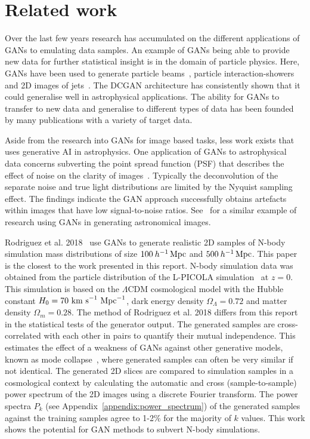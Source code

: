 \documentclass[twocolumn]{article}
\numberwithin{equation}{section}
\begin{document}
\section{Related work}\label{sec:related_work}
Over the last few years research has accumulated on the different applications of GANs to emulating data samples. An 
example of GANs being able to provide new data for further statistical insight is in the domain of particle physics. Here, 
GANs have been used to generate particle beams~\cite{muon_beams_gan}, particle interaction-showers~\cite{particle_showers_gan} 
and 2D images of jets~\cite{particle_jets_gan}. The DCGAN architecture has consistently shown that it could generalise well 
in astrophysical applications. The ability for GANs to transfer to new data and generalise to different types of data has 
been founded by many publications with a variety of target data.

Aside from the research into GANs for image based tasks, less work exists that uses generative AI in astrophysics. One 
application of GANs to astrophysical data concerns subverting the point spread function (PSF) that describes the effect 
of noise on the clarity of images~\cite{gal_im_gen3}. Typically the deconvolution of the separate noise and true light 
distributions are limited by the Nyquist sampling effect. The findings indicate the GAN approach successfully obtains 
artefacts within images that have low signal-to-noise ratios. See~\cite{gal_im_gen2} for a similar example of research 
using GANs in generating astronomical images.

Rodriguez et al. 2018~\cite{web_gan} use GANs to generate realistic 2D samples of N-body simulation mass distributions 
of size $100 \: h^{-1} \,\textup{Mpc}$ and $500 \: h^{-1} \,\textup{Mpc}$. This paper is the closest to the work 
presented in this report. N-body simulation data was obtained from the particle distribution of the L-PICOLA 
simulation~\cite{LPICOLA} at $z=0$. This simulation is based on the $\Lambda \text{CDM}$ cosmological model with 
the Hubble constant $H_0=70\textup{ km s}^{-1}\textup{ Mpc}^{-1}$, dark energy density $\Omega_\Lambda=0.72$ and
matter density $\Omega_m=0.28$. The method of Rodriguez et al. 2018 differs from this report in the statistical 
tests of the generator output. The generated samples are cross-correlated with each other in pairs to quantify 
their mutual independence. This estimates the effect of a weakness of GANs against other generative models, known
as mode collapse~\cite{gf_gan}, where generated samples can often be very similar if not identical. The generated 
2D slices are compared to simulation samples in a cosmological context by calculating the automatic and cross 
(sample-to-sample) power spectrum of the 2D images using a discrete Fourier transform. The power spectra $P_k$ 
(see Appendix~\ref{appendix:power_spectrum}) of the generated samples against the training samples agree to 1-2\% 
for the majority of $k$ values. This work shows the potential for GAN methods to subvert N-body simulations. 
\end{document}
